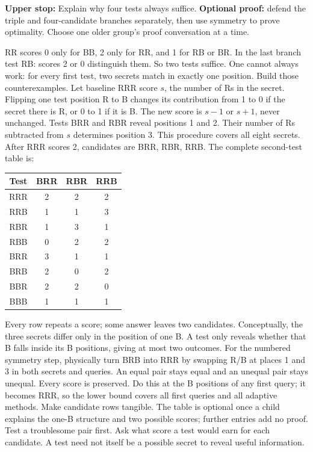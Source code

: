 \documentclass[11pt]{article}
\begin{document}
\textbf{Upper stop:} Explain why four tests always suffice. \textbf{Optional proof:} defend the triple and four-candidate branches separately, then use symmetry to prove optimality. Choose one older group's proof conversation at a time.

\newpage
{}
RR scores 0 only for BB, 2 only for RR, and 1 for RB or BR. In the last branch test RB: scores 2 or 0 distinguish them. So two tests suffice. One cannot always work: for every first test, two secrets match in exactly one position. Build those counterexamples.
Let baseline RRR score \(s\), the number of Rs in the secret. Flipping one test position R to B changes its contribution from 1 to 0 if the secret there is R, or 0 to 1 if it is B. The new score is \(s-1\) or \(s+1\), never unchanged. Tests BRR and RBR reveal positions 1 and 2. Their number of Rs subtracted from \(s\) determines position 3. This procedure covers all eight secrets.
After RRR scores 2, candidates are BRR, RBR, RRB. The complete second-test table is:
\begin{center}\renewcommand{\arraystretch}{1.25}\begin{tabular}{c|ccc}Test&BRR&RBR&RRB\\\hline RRR&2&2&2\\RRB&1&1&3\\RBR&1&3&1\\RBB&0&2&2\\BRR&3&1&1\\BRB&2&0&2\\BBR&2&2&0\\BBB&1&1&1\end{tabular}\end{center}
Every row repeats a score; some answer leaves two candidates. Conceptually, the three secrets differ only in the position of one B. A test only reveals whether that B falls inside its B positions, giving at most two outcomes. For the numbered symmetry step, physically turn BRB into RRR by swapping R/B at places 1 and 3 in both secrets and queries. An equal pair stays equal and an unequal pair stays unequal. Every score is preserved. Do this at the B positions of any first query; it becomes RRR, so the lower bound covers all first queries and all adaptive methods.
Make candidate rows tangible. The table is optional once a child explains the one-B structure and two possible scores; further entries add no proof. Test a troublesome pair first. Ask what score a test would earn for each candidate. A test need not itself be a possible secret to reveal useful information.
\end{document}
